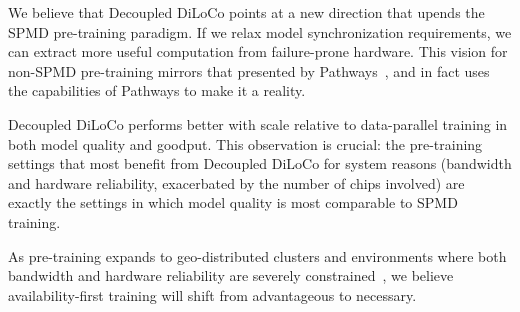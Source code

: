 \documentclass[11pt, a4paper, twocolumn, copyright, google]{google}
\begin{document}
We believe that Decoupled DiLoCo points at a new direction that upends the SPMD pre-training paradigm. If we relax model synchronization requirements, we can extract more useful computation from failure-prone hardware. This vision for non-SPMD pre-training mirrors that presented by Pathways~\citep{barham2022pathways}, and in fact uses the capabilities of Pathways to make it a reality.

Decoupled DiLoCo performs better with scale relative to data-parallel training in both model quality and goodput. This observation is crucial: the pre-training settings that most benefit from Decoupled DiLoCo for system reasons (bandwidth and hardware reliability, exacerbated by the number of chips involved) are exactly the settings in which model quality is most comparable to SPMD training.

As pre-training expands to geo-distributed clusters and environments where both bandwidth and hardware reliability are severely constrained~\citep{aguerayarcas2025future}, we believe availability-first training will shift from advantageous to necessary.

\clearpage
\end{document}
